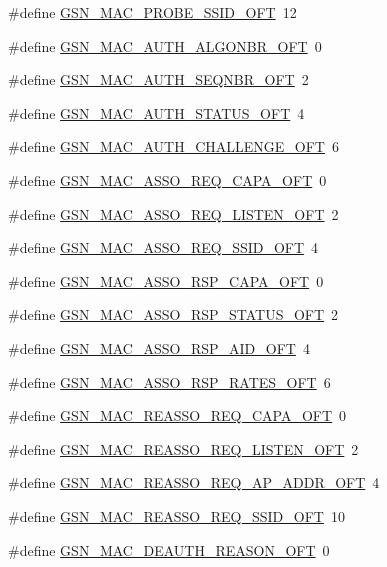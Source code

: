 \begin{DoxyCompactItemize}
\item 
\#define \hyperlink{a00523_abb9065b948956cd1a4b12e9b603354f7}{GSN\_\-MAC\_\-PROBE\_\-SSID\_\-OFT}~12
\item 
\#define \hyperlink{a00523_aa1ee340ec2ac67bdefd6d069c4e74361}{GSN\_\-MAC\_\-AUTH\_\-ALGONBR\_\-OFT}~0
\item 
\#define \hyperlink{a00523_a9e5a9f12185cbe03f9bb26e44de0345d}{GSN\_\-MAC\_\-AUTH\_\-SEQNBR\_\-OFT}~2
\item 
\#define \hyperlink{a00523_a825b12a0f69b5b723b0a0762af43c9e2}{GSN\_\-MAC\_\-AUTH\_\-STATUS\_\-OFT}~4
\item 
\#define \hyperlink{a00523_a8e771c6f853f7df3e577138b4e39b060}{GSN\_\-MAC\_\-AUTH\_\-CHALLENGE\_\-OFT}~6
\item 
\#define \hyperlink{a00523_a74882f14ee8974ebd605e01932af1c27}{GSN\_\-MAC\_\-ASSO\_\-REQ\_\-CAPA\_\-OFT}~0
\item 
\#define \hyperlink{a00523_acfc5a44b92d1e1509ec7cc62f871edb5}{GSN\_\-MAC\_\-ASSO\_\-REQ\_\-LISTEN\_\-OFT}~2
\item 
\#define \hyperlink{a00523_a229dd82bd517b5e92850ceeb67cb0789}{GSN\_\-MAC\_\-ASSO\_\-REQ\_\-SSID\_\-OFT}~4
\item 
\#define \hyperlink{a00523_a92641f963f727de3c44093e4a0ffdca2}{GSN\_\-MAC\_\-ASSO\_\-RSP\_\-CAPA\_\-OFT}~0
\item 
\#define \hyperlink{a00523_acb7c063b275a7c39400b458318562218}{GSN\_\-MAC\_\-ASSO\_\-RSP\_\-STATUS\_\-OFT}~2
\item 
\#define \hyperlink{a00523_a99d2508c6a186641966a723431784d01}{GSN\_\-MAC\_\-ASSO\_\-RSP\_\-AID\_\-OFT}~4
\item 
\#define \hyperlink{a00523_a5f3fa9a82dcf1fdb9a4253367b2ce290}{GSN\_\-MAC\_\-ASSO\_\-RSP\_\-RATES\_\-OFT}~6
\item 
\#define \hyperlink{a00523_a0fe05527c77ffa06e58303fdff1a91da}{GSN\_\-MAC\_\-REASSO\_\-REQ\_\-CAPA\_\-OFT}~0
\item 
\#define \hyperlink{a00523_a3b00199e48ac3d69c92efe08970e1c27}{GSN\_\-MAC\_\-REASSO\_\-REQ\_\-LISTEN\_\-OFT}~2
\item 
\#define \hyperlink{a00523_a69667a7675575e73b192c1cc69a6808a}{GSN\_\-MAC\_\-REASSO\_\-REQ\_\-AP\_\-ADDR\_\-OFT}~4
\item 
\#define \hyperlink{a00523_aa4b1990ba8e4e70b9c3710760110b78e}{GSN\_\-MAC\_\-REASSO\_\-REQ\_\-SSID\_\-OFT}~10
\item 
\#define \hyperlink{a00523_a75a4e020aa2a89ba6a5cabdaaa1d18bd}{GSN\_\-MAC\_\-DEAUTH\_\-REASON\_\-OFT}~0
\item 

\end{DoxyCompactItemize}
